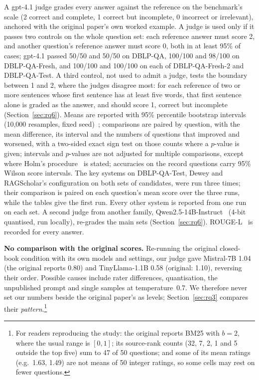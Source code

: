 \documentclass[conference]{IEEEtran}
\newcommand{\dq}{DBLP-QA}
\newcommand{\fresh}{DBLP-QA-Fresh}
\newcommand{\freshb}{DBLP-QA-Fresh-2}
\newcommand{\test}{DBLP-QA-Test}
\begin{document}
A gpt-4.1 judge grades every answer against the reference on the benchmark's scale (2 correct and
complete, 1 correct but incomplete, 0 incorrect or irrelevant), anchored with the original paper's own
worked example. A judge is used only if it passes two controls on the whole question set: each reference
answer must score 2, and another question's reference answer must score 0, both in at least 95\% of
cases; gpt-4.1 passed 50/50 and 50/50 on \dq{}, 100/100 and 98/100 on \fresh{}, and 100/100 and 100/100 on each
of \freshb{} and \test{}. A third control, not used to admit a judge, tests the boundary between 1 and
2, where the judges disagree most: for each reference of two or more sentences whose first sentence has
at least five words, that first sentence alone is graded as the answer, and should score 1, correct but
incomplete (Section~\ref{sec:rq6}). Means are reported with
95\% percentile bootstrap intervals (10{,}000 resamples, fixed seed)~\cite{efron1993bootstrap};
comparisons are paired by question, with the mean difference, its interval and the numbers of questions
that improved and worsened, with a two-sided exact sign test on those counts where a $p$-value is given;
intervals and $p$-values are not adjusted for multiple comparisons, except where Holm's
procedure~\cite{holm1979} is stated;
accuracies on the record questions carry 95\% Wilson score intervals. The key systems on \test{}, Dewey
and RAGScholar's configuration on both sets of candidates, were run three times; their comparison is
paired on each question's mean score over the three runs, while the tables give the first run. Every
other system is reported from one run on each set. A second judge from another family, Qwen2.5-14B-Instruct~\cite{qwen2024qwen25} (4-bit quantised, run
locally), re-grades the main sets (Section~\ref{sec:rq6}). ROUGE-L~\cite{lin2004rouge} is recorded for every answer.

\textbf{No comparison with the original scores.} Re-running the original closed-book condition with its
own models and settings, our judge gave Mistral-7B 1.04 (the original reports 0.80) and TinyLlama-1.1B
0.58 (original: 1.10), reversing their order. Possible causes include rater differences, quantisation,
the unpublished prompt and single samples at temperature~0.7. We therefore never set our numbers beside
the original paper's as levels; Section~\ref{sec:rq3} compares their \emph{pattern}.\footnote{For
readers reproducing the study: the original reports BM25 with $b=2$, where the usual range is $[0,1]$; its
source-rank counts (32, 7, 2, 1 and 5 outside the top five) sum to 47 of 50 questions; and some of its mean
ratings (e.g.\ 1.63, 1.49) are not means of 50 integer ratings, so some cells may rest on fewer
questions.}
\end{document}
